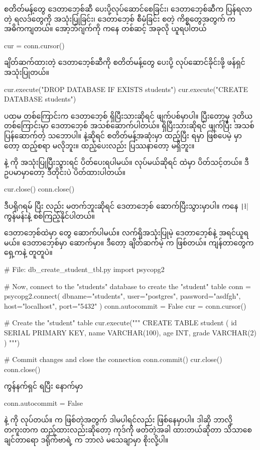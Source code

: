  စတိတ်မန့်တွေ ဒေတာဘေ့စ်ဆီ ပေးပို့လုပ်ဆောင်စေခြင်း၊ ဒေတာဘေ့စ်ဆီက ပြန်ရလာတဲ့ ရလဒ်တွေကို အသုံးပြုခြင်း၊ ဒေတာဘေ့စ်  စီမံခြင်း စတဲ့ ကိစ္စတွေအတွက်  က အဓိကကျတယ်။  အော့ဘ်ဂျက်ကို  ကနေ တစ်ဆင့် အခုလို ယူရပါတယ်
%
\begin{py}
cur = conn.cursor()
\end{py}
%

ချိတ်ဆက်ထားတဲ့ ဒေတာဘေ့စ်ဆီကို  စတိတ်မန့်တွေ ပေးပို့ လုပ်ဆောင်ခိုင်းဖို့  ဖန်ရှင် အသုံးပြုတယ်။  
%
\begin{py}
cur.execute("DROP DATABASE IF EXISTS students")
cur.execute("CREATE DATABASE students")
\end{py}
%
 ပထမ တစ်ကြောင်းက  ဒေတာဘေ့စ် ရှိပြီးသားဆိုရင် ဖျက်ပစ်မှာပါ။ ပြီးတော့မှ ဒုတိယ တစ်ကြောင်းမှာ ဒေတာဘေ့စ် အသစ်ဆောက်ပါတယ်။ ရှိပြီးသားဆိုရင် ဖျက်ပြီး အသစ်ပြန်ဆောက်တဲ့ သဘောပါ။  နဲ့ဆိုရင်  စတိတ်မန့်အဆုံးမှာ \fCode{;} ထည့်ပြီး  ရမှာ ဖြစ်ပေမဲ့  မှာတော့ ထည့်စရာ မလိုဘူး။ ထည့်ပေးလည်း ပြဿနာတော့ မရှိဘူး။


 နဲ့  ကို အသုံးပြုပြီးသွားရင် ပိတ်ပေးရပါမယ်။  လုပ်မယ်ဆိုရင်  ထဲမှာ ပိတ်သင့်တယ်။ ဒီဥပမာမှာတော့ ဒီတိုင်းပဲ ပိတ်ထားပါတယ်။
%
\begin{py}
cur.close()
conn.close()
\end{py}
%
ဒီပရိုဂရမ်  ပြီး  လည်း မတက်ဘူးဆိုရင်  ဒေတာဘေ့စ် ဆောက်ပြီးသွားမှာပါ။  ကနေ \texttt|\l| ကွန်မန်းနဲ့ စစ်ကြည့်နိုင်ပါတယ်။









ဒေတာဘေ့စ်ထဲမှာ  တွေ ဆောက်ပါမယ်။ လက်ရှိအသုံးပြုမဲ့ ဒေတာဘေ့စ်နဲ့  အရင်ယူရမယ်။  ဒေတာဘေ့စ်မှာ   ဆောက်မှာ။ ဒီတော့ ချိတ်ဆက်မဲ့  က  ဖြစ်တယ်။ ကျန်တာတွေက ရှေ့ကနဲ့ တူတူပဲ။
%
\begin{py}
# File: db_create_student_tbl.py
import psycopg2

# Now, connect to the "students" database to create the "student" table
conn = psycopg2.connect(
    dbname="students",
    user="postgres",
    password="asdfgh",
    host="localhost",
    port="5432"
)
conn.autocommit = False
cur = conn.cursor()

# Create the "student" table
cur.execute("""
    CREATE TABLE student (
        id SERIAL PRIMARY KEY,
        name VARCHAR(100),
        age INT,
        grade VARCHAR(2)
    )
""")

# Commit changes and close the connection
conn.commit()
cur.close()
conn.close()
\end{py}
%
ကွန်နက်ရှင် ရပြီး နောက်မှာ
%
\begin{py}
conn.autocommit = False
\end{py}
%
နဲ့  ကို  လုပ်တယ်။   က  ဖြစ်တဲ့အတွက် ဒါမပါရင်လည်း  ဖြစ်နေမှာပါ။ ဒါဆို ဘာလို့ တကူးတက ထည့်ထားလည်းဆိုတော့ ကုဒ်ကို ဖတ်တဲ့အခါ  ထားတယ်ဆိုတာ သိသာစေချင်တာရော ဒရိုက်ဗာရဲ့  က  ဘာလဲ မသေချာမှာ စိုးလို့ပါ။  

